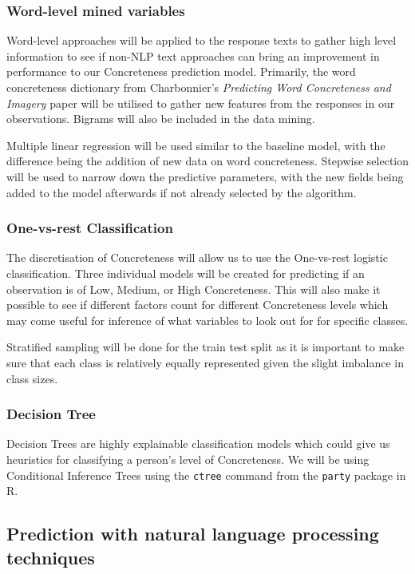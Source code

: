 \documentclass[12pt, a4paper]{article}
\begin{document}
\subsubsection{Word-level mined variables}
Word-level approaches will be applied to the response texts to gather high level information to see if non-NLP text approaches can bring an improvement in performance to our Concreteness prediction model. Primarily, the word concreteness dictionary from Charbonnier's \textit{Predicting Word Concreteness and Imagery} paper \cite{charbonnier-wartena-2019-predicting} will be utilised to gather new features from the responses in our observations. Bigrams will also be included in the data mining.

Multiple linear regression will be used similar to the baseline model, with the difference being the addition of new data on word concreteness. Stepwise selection will be used to narrow down the predictive parameters, with the new fields being added to the model afterwards if not already selected by the algorithm. 


\subsubsection{One-vs-rest Classification}
The discretisation of Concreteness will allow us to use the One-vs-rest logistic classification. Three individual models will be created for predicting if an observation is of Low, Medium, or High Concreteness. This will also make it possible to see if different factors count for different Concreteness levels which may come useful for inference of what variables to look out for for specific classes. 

Stratified sampling will be done for the train test split as it is important to make sure that each class is relatively equally represented given the slight imbalance in class sizes.

\subsubsection{Decision Tree}
Decision Trees are highly explainable classification models which could give us heuristics for classifying a person's level of Concreteness. We will be using Conditional Inference Trees \cite{ctree} using the \lstinline{ctree} command  from the \lstinline{party} package in R.

\subsection{Prediction with natural language processing techniques}
\end{document}
